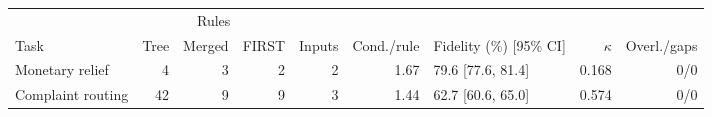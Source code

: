 \begin{tabular}{@{}lrrrrrlrr@{}}
\toprule
 & \multicolumn{3}{c}{Rules} & & & & & \\ \cmidrule(lr){2-4}
Task & Tree & Merged & FIRST & Inputs & Cond./rule & Fidelity (\%) [95\% CI] & $\kappa$ & Overl./gaps \\
\midrule
Monetary relief & 4 & 3 & 2 & 2 & 1.67 & 79.6 [77.6, 81.4] & 0.168 & 0/0 \\
Complaint routing & 42 & 9 & 9 & 3 & 1.44 & 62.7 [60.6, 65.0] & 0.574 & 0/0 \\
\bottomrule
\end{tabular}
